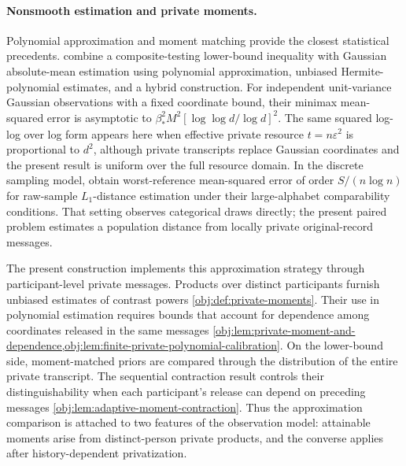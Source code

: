 \paragraph{Nonsmooth estimation and private moments.}
Polynomial approximation and moment matching provide the closest statistical precedents. \citet[Theorem~1 and Sections~3--5]{CaiLow2011Nonsmooth} combine a composite-testing lower-bound inequality with Gaussian absolute-mean estimation using polynomial approximation, unbiased Hermite-polynomial estimates, and a hybrid construction. For independent unit-variance Gaussian observations with a fixed coordinate bound, their minimax mean-squared error is asymptotic to \(\beta_*^2M^2[\log\log d/\log d]^2\). The same squared log-log over log form appears here when effective private resource \(t=n\varepsilon^2\) is proportional to \(d^2\), although private transcripts replace Gaussian coordinates and the present result is uniform over the full resource domain. In the discrete sampling model, \citet[Theorems~2--4]{JiaoHanWeissman2018L1} obtain worst-reference mean-squared error of order \(S/(n\log n)\) for raw-sample \(L_1\)-distance estimation under their large-alphabet comparability conditions. That setting observes categorical draws directly; the present paired problem estimates a population distance from locally private original-record messages.

The present construction implements this approximation strategy through participant-level private messages. Products over distinct participants furnish unbiased estimates of contrast powers \cref{obj:def:private-moments}. Their use in polynomial estimation requires bounds that account for dependence among coordinates released in the same messages \cref{obj:lem:private-moment-and-dependence,obj:lem:finite-private-polynomial-calibration}. On the lower-bound side, moment-matched priors are compared through the distribution of the entire private transcript. The sequential contraction result controls their distinguishability when each participant's release can depend on preceding messages \cref{obj:lem:adaptive-moment-contraction}. Thus the approximation comparison is attached to two features of the observation model: attainable moments arise from distinct-person private products, and the converse applies after history-dependent privatization.

